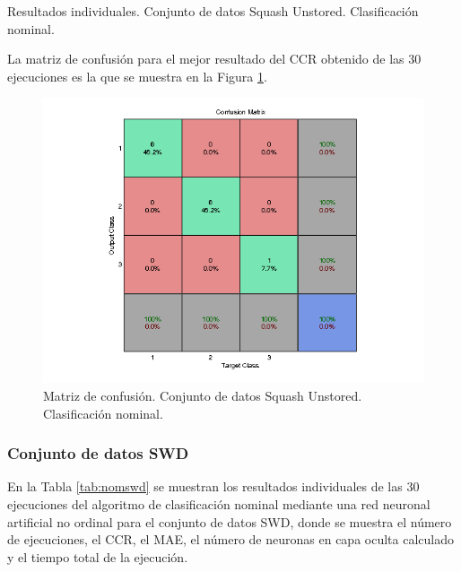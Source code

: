 			\begin{table}[!htbp]
				\centering
				\caption{Resultados individuales. Conjunto de datos Squash Unstored. Clasificación nominal.}
				\label{tab:nomsqua}
			\end{table}
			
			La matriz de confusión para el mejor resultado del CCR obtenido de las 30 ejecuciones es la que se muestra en la Figura \ref{fig:nomsqua}.
			
			\begin{figure}[htbp]
				\centering
				\includegraphics[scale=0.8]{../src/results/nominal/squash-unstored_mc20.png}
				\caption{Matriz de confusión. Conjunto de datos Squash Unstored. Clasificación nominal.}
				\label{fig:nomsqua}
			\end{figure}

			\subsubsection{Conjunto de datos SWD}
			
			En la Tabla \ref{tab:nomswd} se muestran los resultados individuales de las 30 ejecuciones del algoritmo de clasificación nominal mediante una red neuronal artificial no ordinal para el conjunto de datos SWD, donde se muestra el número de ejecuciones, el CCR, el MAE, el número de neuronas en capa oculta calculado y el tiempo total de la ejecución.\\
			
